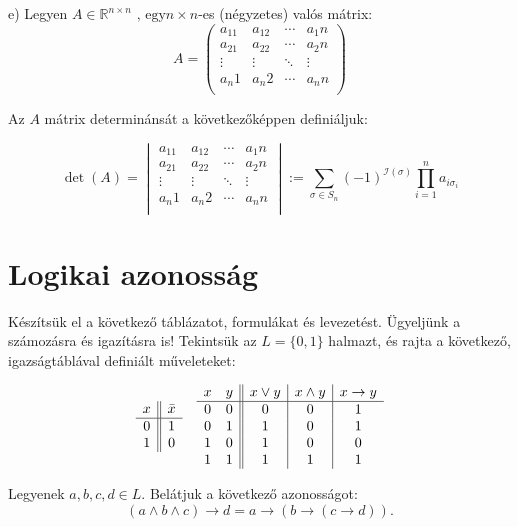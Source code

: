 \documentclass{article}
\begin{document}
e) Legyen $A \in \mathbb{R}^{n \times n} \text{ , egy}n \times n$-es (négyzetes) valós mátrix:
\[ A= \left( \begin{matrix}
a_11 & a_12 & \cdots & a_1n \\
a_21 & a_22 & \cdots & a_2n \\
\vdots & \vdots & \ddots & \vdots\\
a_n1 & a_n2 & \cdots & a_nn \\
\end{matrix} \right) \]

Az $A$ mátrix determinánsát a következőképpen definiáljuk:

\begin{equation}
\operatorname{det}(A) = \begin{vmatrix}
a_11 & a_12 & \cdots & a_1n\\
a_21 & a_22 & \cdots & a_2n\\
\vdots & \vdots & \ddots & \vdots\\
a_n1 & a_n2 & \cdots & a_nn\\
\end{vmatrix}:= \sum_{\sigma \in S_n} (-1)^{\mathcal{I}(\sigma)} \prod_{i=1}^n a_{i\sigma_i}
\label{kettes}
\end{equation}

\section{Logikai azonosság}

Készítsük el a következő táblázatot, formulákat és levezetést. Ügyeljünk a számozásra és igazításra is!
Tekintsük az $L = \lbrace0,1\rbrace$ halmazt, és rajta a következő, igazságtáblával definiált műveleteket:

\[\begin{array}{c||c}
x & \bar{x} \\ \hline
0 & 1\\
1 & 0\\
\end{array}
\quad
\begin{array}{c c || c | c | c}
x & y & x \vee y & x \wedge y & x \rightarrow y \\ \hline
0 & 0 & 0 & 0 & 1\\
0 & 1 & 1 & 0 & 1\\
1 & 0 & 1 & 0 & 0\\
1 & 1 & 1 & 1 & 1\\
\end{array}\]

Legyenek $a,b,c,d \in L$. Belátjuk a következő azonosságot:
\begin{equation}
(a \wedge b \wedge c) \rightarrow d = a \rightarrow ( b \rightarrow ( c \rightarrow d ) ) \text{.}
\label{eq:harom}
\end{equation}
\end{document}
